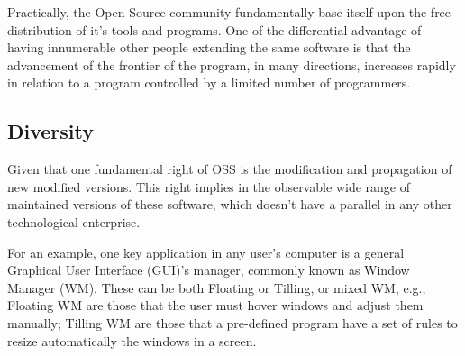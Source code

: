 \documentclass[
12pt,				%
openright,			%
oneside,			%
a4paper,			%
brazil,				%
english,			%
]{abntex2}
\begin{document}


Practically, the Open Source community fundamentally base itself upon
the free distribution of it's tools and programs. One of the differential
advantage of having innumerable other people extending the same
software is that the advancement of the frontier of the program, in
many directions, increases rapidly in relation to a program controlled
by a limited number of programmers.


\subsection{Diversity}
\label{sec:diversity}

Given that one fundamental right of OSS is the modification and
propagation of new modified versions. This right implies in the
observable wide range of maintained versions of these software, which
doesn't have a parallel in any other technological enterprise. 

For an example, one key application in any user's computer is a general
Graphical User Interface (GUI)'s manager, commonly known as Window
Manager (WM). These can be both Floating or Tilling, or mixed WM,
e.g., Floating WM are those that the user must hover windows and
adjust them manually; Tilling WM are those that a pre-defined program
have a set of rules to resize automatically the windows in a screen.
\end{document}
